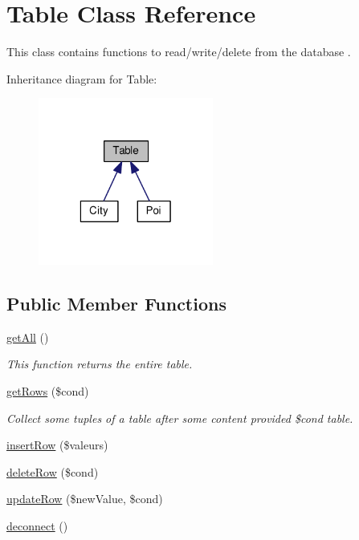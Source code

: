 \hypertarget{class_table}{\section{Table Class Reference}
\label{class_table}
}


This class contains functions to read/write/delete from the database .  




Inheritance diagram for Table\-:\nopagebreak
\begin{figure}[H]
\begin{center}
\leavevmode
\includegraphics[width=163pt]{class_table__inherit__graph}
\end{center}
\end{figure}
\subsection*{Public Member Functions}
\begin{DoxyCompactItemize}
\item 
\hyperlink{class_table_aba0d5b303383fb5b1fabb5fd01cd3800}{get\-All} ()
\begin{DoxyCompactList}\small\item\em This function returns the entire table. \end{DoxyCompactList}\item 
\hyperlink{class_table_a2f4379fc75908df9538e80a8a7f1043a}{get\-Rows} (\$cond)
\begin{DoxyCompactList}\small\item\em Collect some tuples of a table after some content provided \$cond table. \end{DoxyCompactList}\item 
\hyperlink{class_table_a60590b38a52542f17a63f5211ba3a111}{insert\-Row} (\$valeurs)
\item 
\hyperlink{class_table_a9d23647d9285ae7c3066280c9ad2bf9f}{delete\-Row} (\$cond)
\item 
\hyperlink{class_table_a3ee38d1ab83f5834b5ffeae8daad85f8}{update\-Row} (\$new\-Value, \$cond)
\item 
\hyperlink{class_table_a8a406dace7e7ab080d58066e627c6465}{deconnect} ()
\end{DoxyCompactItemize}
